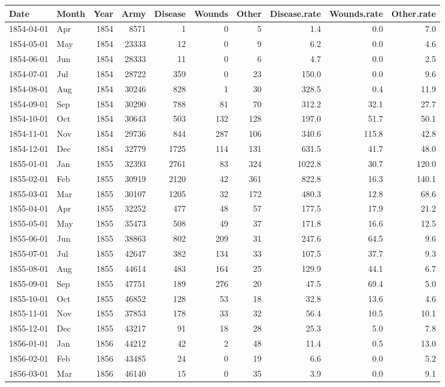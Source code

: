 \documentclass[
]{article}
\newenvironment{Shaded}{\begin{snugshade}}{\end{snugshade}}
\newcommand{\DataTypeTok}[1]{\textcolor[rgb]{0.13,0.29,0.53}{#1}}
\newcommand{\DecValTok}[1]{\textcolor[rgb]{0.00,0.00,0.81}{#1}}
\newcommand{\KeywordTok}[1]{\textcolor[rgb]{0.13,0.29,0.53}{\textbf{#1}}}
\newcommand{\NormalTok}[1]{#1}
\newcommand{\OperatorTok}[1]{\textcolor[rgb]{0.81,0.36,0.00}{\textbf{#1}}}
\newcommand{\StringTok}[1]{\textcolor[rgb]{0.31,0.60,0.02}{#1}}
\begin{document}
\begin{longtable}[]{@{}llrrrrrrrr@{}}
\toprule
Date & Month & Year & Army & Disease & Wounds & Other & Disease.rate &
Wounds.rate & Other.rate\tabularnewline
\midrule
\endhead
1854-04-01 & Apr & 1854 & 8571 & 1 & 0 & 5 & 1.4 & 0.0 &
7.0\tabularnewline
1854-05-01 & May & 1854 & 23333 & 12 & 0 & 9 & 6.2 & 0.0 &
4.6\tabularnewline
1854-06-01 & Jun & 1854 & 28333 & 11 & 0 & 6 & 4.7 & 0.0 &
2.5\tabularnewline
1854-07-01 & Jul & 1854 & 28722 & 359 & 0 & 23 & 150.0 & 0.0 &
9.6\tabularnewline
1854-08-01 & Aug & 1854 & 30246 & 828 & 1 & 30 & 328.5 & 0.4 &
11.9\tabularnewline
1854-09-01 & Sep & 1854 & 30290 & 788 & 81 & 70 & 312.2 & 32.1 &
27.7\tabularnewline
1854-10-01 & Oct & 1854 & 30643 & 503 & 132 & 128 & 197.0 & 51.7 &
50.1\tabularnewline
1854-11-01 & Nov & 1854 & 29736 & 844 & 287 & 106 & 340.6 & 115.8 &
42.8\tabularnewline
1854-12-01 & Dec & 1854 & 32779 & 1725 & 114 & 131 & 631.5 & 41.7 &
48.0\tabularnewline
1855-01-01 & Jan & 1855 & 32393 & 2761 & 83 & 324 & 1022.8 & 30.7 &
120.0\tabularnewline
1855-02-01 & Feb & 1855 & 30919 & 2120 & 42 & 361 & 822.8 & 16.3 &
140.1\tabularnewline
1855-03-01 & Mar & 1855 & 30107 & 1205 & 32 & 172 & 480.3 & 12.8 &
68.6\tabularnewline
1855-04-01 & Apr & 1855 & 32252 & 477 & 48 & 57 & 177.5 & 17.9 &
21.2\tabularnewline
1855-05-01 & May & 1855 & 35473 & 508 & 49 & 37 & 171.8 & 16.6 &
12.5\tabularnewline
1855-06-01 & Jun & 1855 & 38863 & 802 & 209 & 31 & 247.6 & 64.5 &
9.6\tabularnewline
1855-07-01 & Jul & 1855 & 42647 & 382 & 134 & 33 & 107.5 & 37.7 &
9.3\tabularnewline
1855-08-01 & Aug & 1855 & 44614 & 483 & 164 & 25 & 129.9 & 44.1 &
6.7\tabularnewline
1855-09-01 & Sep & 1855 & 47751 & 189 & 276 & 20 & 47.5 & 69.4 &
5.0\tabularnewline
1855-10-01 & Oct & 1855 & 46852 & 128 & 53 & 18 & 32.8 & 13.6 &
4.6\tabularnewline
1855-11-01 & Nov & 1855 & 37853 & 178 & 33 & 32 & 56.4 & 10.5 &
10.1\tabularnewline
1855-12-01 & Dec & 1855 & 43217 & 91 & 18 & 28 & 25.3 & 5.0 &
7.8\tabularnewline
1856-01-01 & Jan & 1856 & 44212 & 42 & 2 & 48 & 11.4 & 0.5 &
13.0\tabularnewline
1856-02-01 & Feb & 1856 & 43485 & 24 & 0 & 19 & 6.6 & 0.0 &
5.2\tabularnewline
1856-03-01 & Mar & 1856 & 46140 & 15 & 0 & 35 & 3.9 & 0.0 &
9.1\tabularnewline
\bottomrule
\end{longtable}

\begin{Shaded}
\end{Shaded}
\end{document}
